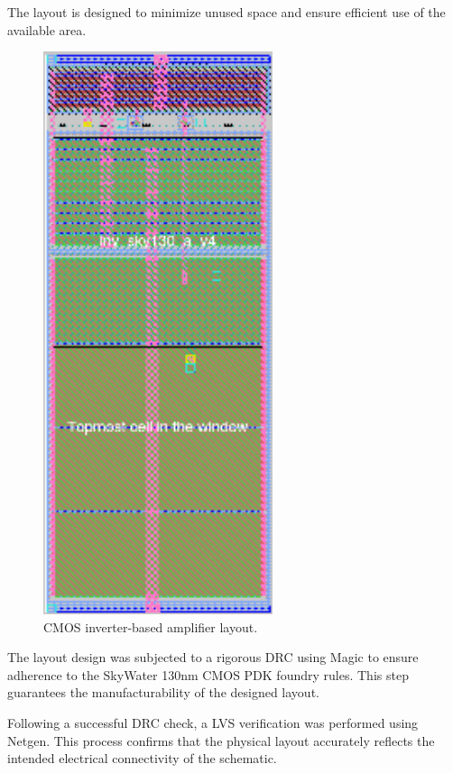 The layout is designed to minimize unused space and ensure efficient use of the available area.

\begin{figure}[ht!]
\centering
\includegraphics[width=0.6\textwidth]{Figures/final_layout.png}
\caption{CMOS inverter-based amplifier layout.}
\label{fig:layout_v4}
\end{figure}

The layout design was subjected to a rigorous DRC using Magic to ensure adherence to the SkyWater 130nm CMOS PDK foundry rules. 
This step guarantees the manufacturability of the designed layout.

Following a successful DRC check, a LVS verification was performed using Netgen. 
This process confirms that the physical layout accurately reflects the intended electrical connectivity of the schematic.

